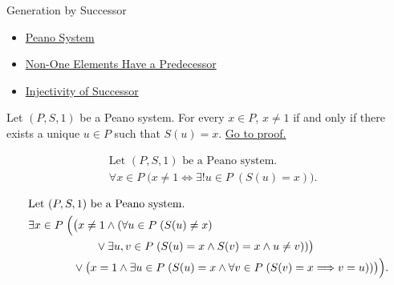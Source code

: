 \begin{topicbox}{Generation by Successor}
\begin{dependencies}
\begin{itemize}
  \item \hyperref[def:peano-system]{Peano System}
  \item \hyperref[cor:non-one-elements-have-a-predecessor]{Non-One Elements Have a Predecessor}
  \item \hyperref[ax:peano-successor-injective]{Injectivity of Successor}
\end{itemize}
\end{dependencies}

\begin{tcolorbox}[colback=corbox, colframe=corborder, arc=2pt,
  left=6pt, right=6pt, top=4pt, bottom=4pt,
  title={\small\textbf{Corollary (Unique Predecessor Characterization Away from \texorpdfstring{$1$}{1})}} ,
  fonttitle=\small\bfseries]
\begin{corollary}
\label{cor:unique-predecessor-characterization-away-from-one}
Let $(P,S,1)$ be a Peano system. For every $x \in P$, $x \neq 1$ if and
only if there exists a unique $u \in P$ such that $S(u)=x$.
\hyperref[prf:unique-predecessor-characterization-away-from-one]{Go to proof.}
\end{corollary}
\end{tcolorbox}

\begin{remark*}
\[
\begin{aligned}
&\text{Let } (P,S,1) \text{ be a Peano system.}\\
&\forall x \in P\;\bigl(x\neq 1 \Longleftrightarrow
\exists! u \in P\;(S(u)=x)\bigr).
\end{aligned}
\]
\end{remark*}

\begin{remark*}
\[
\begin{aligned}
&\text{Let } (P,S,1) \text{ be a Peano system.}\\
&\exists x \in P\;\Bigl(
\bigl(x\neq 1 \land
(\forall u \in P\;(S(u)\neq x)\\
&\qquad\qquad\qquad\lor
\exists u,v \in P\;(S(u)=x \land S(v)=x \land u\neq v))\bigr)\\
&\qquad\qquad\lor
\bigl(x=1 \land \exists u \in P\;(S(u)=x \land
\forall v \in P\;(S(v)=x \Longrightarrow v=u))\bigr)
\Bigr).
\end{aligned}
\]
\end{remark*}


\end{topicbox}
